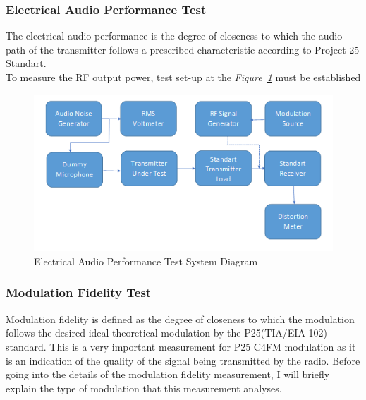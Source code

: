 




\subsubsection{Electrical Audio Performance Test}
\- \indent
	The electrical audio performance is the degree of closeness to which the audio path of the transmitter follows a prescribed characteristic according to Project 25 Standart\cite{P25}.\\

	To measure the RF output power, test set-up at the \textit{Figure~\ref{fig:elecaudio}} must be established
	
\begin{figure}[H]
	\center
	\setlength{\unitlength}{\textwidth} 
	\includegraphics[width=1.0\unitlength]{elecaudio}
	\caption{\label{fig:elecaudio}Electrical Audio Performance Test System Diagram }
\end{figure}

\newpage

\subsubsection{Modulation Fidelity Test}
\- \indent
	Modulation fidelity is defined as the degree of closeness to which the modulation follows the desired ideal theoretical modulation by the P25(TIA/EIA-102) standard\cite{fidelity}. This is a very important measurement for P25 C4FM modulation as it is an indication of the quality of the signal being transmitted by the radio. Before going into the details of the
modulation fidelity measurement, I will briefly explain the type
of modulation that this measurement analyses.\\

